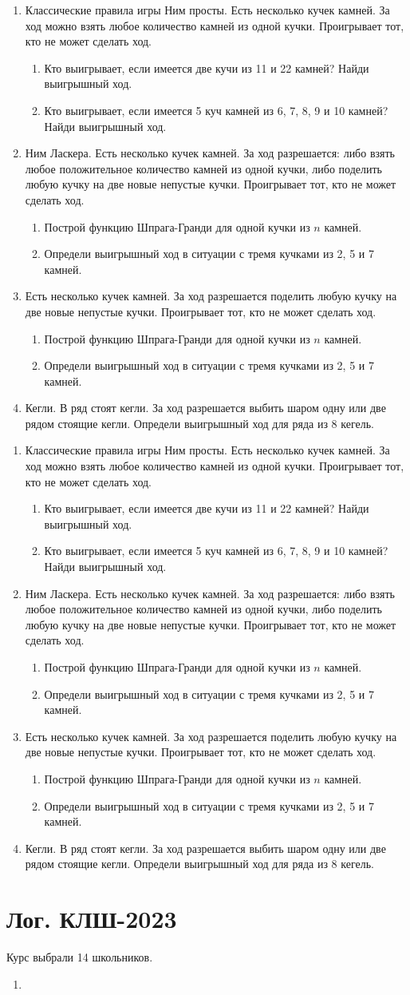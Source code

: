 \documentclass[12pt]{article}
\theoremstyle{definition}
\begin{document}
\newcommand{\daytwo}{
\begin{enumerate}
  \item Классические правила игры Ним просты. Есть несколько кучек камней. За ход можно взять любое
  количество камней из одной кучки. Проигрывает тот, кто не может сделать ход.
  \begin{enumerate}
    \item Кто выигрывает, если имеется две кучи из 11 и 22 камней? Найди выигрышный ход.
    \item Кто выигрывает, если имеется 5 куч камней из 6, 7, 8, 9 и 10 камней? Найди выигрышный ход.
  \end{enumerate}
  \item Ним Ласкера. Есть несколько кучек камней. За ход разрешается: либо взять любое положительное количество
  камней из одной кучки, либо поделить любую кучку на две новые непустые кучки. Проигрывает
  тот, кто не может сделать ход.
  \begin{enumerate}
    \item Построй функцию Шпрага-Гранди для одной кучки из $n$ камней.
    \item Определи выигрышный ход в ситуации с тремя кучками из 2, 5 и 7 камней.
  \end{enumerate}
  \item Есть несколько кучек камней. За ход разрешается поделить любую кучку на две новые непустые кучки. 
  Проигрывает тот, кто не может сделать ход.
  \begin{enumerate}
    \item Построй функцию Шпрага-Гранди для одной кучки из $n$ камней.
    \item Определи выигрышный ход в ситуации с тремя кучками из 2, 5 и 7 камней.
  \end{enumerate}
  \item Кегли. В ряд стоят кегли. За ход разрешается выбить шаром одну или две рядом стоящие кегли. 
  Определи выигрышный ход для ряда из 8 кегель. 
  
\end{enumerate}
}
\newpage
\daytwo
\vfill
\daytwo
\newpage



\section{Лог. КЛШ-2023}

Курс выбрали 14 школьников.

\begin{enumerate}
  \item 
\end{enumerate}
\end{document}
